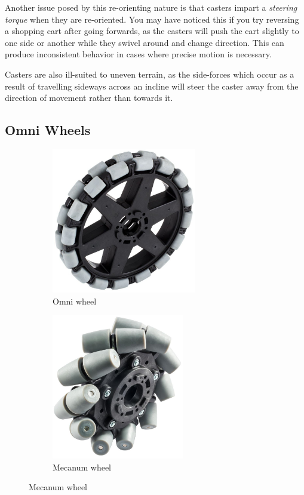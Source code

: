 	Another issue posed by this re-orienting nature is that casters impart a \textit{steering torque} when they are re-oriented. You may have noticed this if you try reversing a shopping cart after going forwards, as the casters will push the cart slightly to one side or another while they swivel around and change direction. This can produce inconsistent behavior in cases where precise motion is necessary.

	Casters are also ill-suited to uneven terrain, as the side-forces which occur as a result of travelling sideways across an incline will steer the caster away from the direction of movement rather than towards it.
	
	\subsection{Omni Wheels}
	
	\begin{figure}[H]
		\begin{subfigure}[b]{.45\linewidth}
			\includegraphics[height=2.5in]{imgs/wheel_omni.png}
			\caption{Omni wheel}
		\end{subfigure}\begin{subfigure}[b]{.45\linewidth}
			\includegraphics[height=2.5in]{imgs/wheel_mecanum.png}
			\caption{Mecanum wheel}
		\end{subfigure}
	\end{figure}
	
